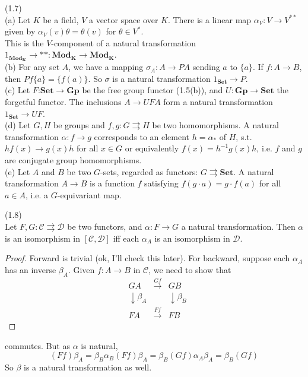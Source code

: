 \documentclass[a4paper]{article}
\begin{document}
\begin{eg} (1.7)\\
    (a) Let $K$ be a field, $V$ a vector space over $K$. There is a linear map $\alpha_V : V \to V^{**}$ given by $\alpha_V (v) \theta = \theta(v)$ for $\theta \in V^*$.\\
    This is the $V$-component of a natural transformation $1_{\mathbf{Mod_K}} \to **: \mathbf{Mod_K} \to \mathbf{Mod_K}$.\\
    (b) For any set $A$, we have a mapping $\sigma_A:A \to PA$ sending $a$ to $\{a\}$. If $f:A \to B$, then $Pf\{a\} = \{f(a)\}$. So $\sigma$ is a natural transformation $1_{\mathbf{Set}} \to P$.\\
    (c) Let $F$:$\mathbf{Set} \to \mathbf{Gp}$ be the free group functor (1.5(b)), and $U: \mathbf{Gp} \to \mathbf{Set}$ the forgetful functor. The inclusions $A \to UFA$ form a natural transformation $1_{\mathbf{Set}} \to UF$.\\
    (d) Let $G,H$ be groups and $f,g: G \rightrightarrows H$ be two homomorphisms. A natural transformation $\alpha: f \to g$ corresponds to an element $h=\alpha_*$ of $H$, s.t. $h f(x) \to g(x) h$ for all $x \in G$ or equivalently $f(x) = h^{-1} g(x) h$, i.e. $f$ and $g$ are conjugate group homomorphisms.\\
    (e) Let $A$ and $B$ be two $G$-sets, regarded as functors: $G \rightrightarrows \mathbf{Set}$. A natural transformation $A \to B$ is a function $f$ satisfying $f(g\cdot a) = g \cdot f(a)$ for all $a \in A$, i.e. a $G$-equivariant map.
\end{eg}

\begin{lemma} (1.8)\\
    Let $F,G: \mathcal{C} \rightrightarrows \mathcal{D}$ be two functors, and $\alpha: F \to G$ a natural transformation. Then $\alpha$ is an isomorphism in $[\mathcal{C},\mathcal{D}]$ iff each $\alpha_A$ is an isomorphism in $\mathcal{D}$.
    \begin{proof}
        Forward is trivial (ok, I'll check this later). For backward, suppose each $\alpha_A$ has an inverse $\beta_A$. Given $f:A \to B$ in $\mathcal{C}$, we need to show that 
        \begin{equation*}
            \begin{aligned}
                &GA &\xrightarrow{Gf} &GB\\
                &\downarrow \beta_A & &\downarrow \beta_B\\
                &FA &\xrightarrow{Ff} & FB
            \end{aligned}
        \end{equation*}
    \end{proof}
    commutes. But as $\alpha$ is natural, 
    $$(Ff)\beta_A = \beta_B \alpha_B (Ff)\beta_A = \beta_B (Gf) \alpha_A \beta_A = \beta_B (Gf)$$
    So $\beta$ is a natural transformation as well.
\end{lemma}
\end{document}
